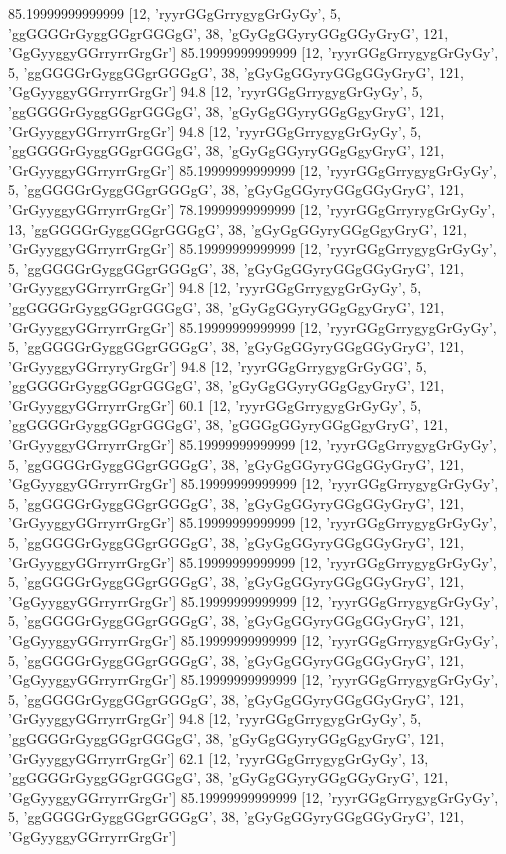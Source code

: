 85.19999999999999 [12, 'ryyrGGgGrrygygGrGyGy', 5, 'ggGGGGrGyggGGgrGGGgG', 38, 'gGyGgGGyryGGgGGyGryG', 121, 'GgGyyggyGGrryrrGrgGr']
85.19999999999999 [12, 'ryyrGGgGrrygygGrGyGy', 5, 'ggGGGGrGyggGGgrGGGgG', 38, 'gGyGgGGyryGGgGGyGryG', 121, 'GgGyyggyGGrryrrGrgGr']
94.8 [12, 'ryyrGGgGrrygygGrGyGy', 5, 'ggGGGGrGyggGGgrGGGgG', 38, 'gGyGgGGyryGGgGgyGryG', 121, 'GrGyyggyGGrryrrGrgGr']
94.8 [12, 'ryyrGGgGrrygygGrGyGy', 5, 'ggGGGGrGyggGGgrGGGgG', 38, 'gGyGgGGyryGGgGgyGryG', 121, 'GrGyyggyGGrryrrGrgGr']
85.19999999999999 [12, 'ryyrGGgGrrygygGrGyGy', 5, 'ggGGGGrGyggGGgrGGGgG', 38, 'gGyGgGGyryGGgGGyGryG', 121, 'GrGyyggyGGrryrrGrgGr']
78.19999999999999 [12, 'ryyrGGgGrryrygGrGyGy', 13, 'ggGGGGrGyggGGgrGGGgG', 38, 'gGyGgGGyryGGgGgyGryG', 121, 'GrGyyggyGGrryrrGrgGr']
85.19999999999999 [12, 'ryyrGGgGrrygygGrGyGy', 5, 'ggGGGGrGyggGGgrGGGgG', 38, 'gGyGgGGyryGGgGGyGryG', 121, 'GrGyyggyGGrryrrGrgGr']
94.8 [12, 'ryyrGGgGrrygygGrGyGy', 5, 'ggGGGGrGyggGGgrGGGgG', 38, 'gGyGgGGyryGGgGgyGryG', 121, 'GrGyyggyGGrryrrGrgGr']
85.19999999999999 [12, 'ryyrGGgGrrygygGrGyGy', 5, 'ggGGGGrGyggGGgrGGGgG', 38, 'gGyGgGGyryGGgGGyGryG', 121, 'GrGyyggyGGrryryGrgGr']
94.8 [12, 'ryyrGGgGrrygygGrGyGG', 5, 'ggGGGGrGyggGGgrGGGgG', 38, 'gGyGgGGyryGGgGgyGryG', 121, 'GrGyyggyGGrryrrGrgGr']
60.1 [12, 'ryyrGGgGrrygygGrGyGy', 5, 'ggGGGGrGyggGGgrGGGgG', 38, 'gGGGgGGyryGGgGgyGryG', 121, 'GrGyyggyGGrryrrGrgGr']
85.19999999999999 [12, 'ryyrGGgGrrygygGrGyGy', 5, 'ggGGGGrGyggGGgrGGGgG', 38, 'gGyGgGGyryGGgGGyGryG', 121, 'GgGyyggyGGrryrrGrgGr']
85.19999999999999 [12, 'ryyrGGgGrrygygGrGyGy', 5, 'ggGGGGrGyggGGgrGGGgG', 38, 'gGyGgGGyryGGgGGyGryG', 121, 'GrGyyggyGGrryrrGrgGr']
85.19999999999999 [12, 'ryyrGGgGrrygygGrGyGy', 5, 'ggGGGGrGyggGGgrGGGgG', 38, 'gGyGgGGyryGGgGGyGryG', 121, 'GrGyyggyGGrryrrGrgGr']
85.19999999999999 [12, 'ryyrGGgGrrygygGrGyGy', 5, 'ggGGGGrGyggGGgrGGGgG', 38, 'gGyGgGGyryGGgGGyGryG', 121, 'GgGyyggyGGrryrrGrgGr']
85.19999999999999 [12, 'ryyrGGgGrrygygGrGyGy', 5, 'ggGGGGrGyggGGgrGGGgG', 38, 'gGyGgGGyryGGgGGyGryG', 121, 'GgGyyggyGGrryrrGrgGr']
85.19999999999999 [12, 'ryyrGGgGrrygygGrGyGy', 5, 'ggGGGGrGyggGGgrGGGgG', 38, 'gGyGgGGyryGGgGGyGryG', 121, 'GgGyyggyGGrryrrGrgGr']
85.19999999999999 [12, 'ryyrGGgGrrygygGrGyGy', 5, 'ggGGGGrGyggGGgrGGGgG', 38, 'gGyGgGGyryGGgGGyGryG', 121, 'GrGyyggyGGrryrrGrgGr']
94.8 [12, 'ryyrGGgGrrygygGrGyGy', 5, 'ggGGGGrGyggGGgrGGGgG', 38, 'gGyGgGGyryGGgGgyGryG', 121, 'GrGyyggyGGrryrrGrgGr']
62.1 [12, 'ryyrGGgGrrygygGrGyGy', 13, 'ggGGGGrGyggGGgrGGGgG', 38, 'gGyGgGGyryGGgGGyGryG', 121, 'GgGyyggyGGrryrrGrgGr']
85.19999999999999 [12, 'ryyrGGgGrrygygGrGyGy', 5, 'ggGGGGrGyggGGgrGGGgG', 38, 'gGyGgGGyryGGgGGyGryG', 121, 'GgGyyggyGGrryrrGrgGr']
